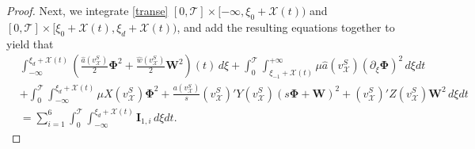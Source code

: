 \documentclass[10pt,a4paper]{amsart}
\def\T{\mathcal{T}}
\def\X{\mathcal{X}}
\def\ph{\mathbf{\Phi}}
\def\p{\partial}
\def\vsx{v^S_{\mathcal{X}}}
\def\w{\mathbf{W}}
\begin{document}
\begin{proof}
	 Next, we integrate \eqref{transe} $[0,\T]\times[-\infty,\xi_0+\X(t))$ and $[0,\T]\times[\xi_0+\X(t),\xi_d+\X(t))$, and add the resulting equations together to yield that
	 \begin{equation}\label{neg-part}
	 	\begin{aligned}
	 		&\int_{-\infty}^{\xi_d+\X(t)}\left(\frac{\hat{a}(\vsx)}{2}\ph^2+\frac{\hat{w}(\vsx)}{2}\w^2\right)(t)\,d\xi+\int_{0}^{\T}\int_{\xi_{-1}+\X(t)}^{+\infty}\mu \hat{a}(\vsx)(\p_{\xi}\ph)^2\,d\xi dt\\
	 		&+\int_{0}^{\T}\int_{-\infty}^{\xi_d+\X(t)}\mu X(\vsx)\ph^2+\frac{a(\vsx)}{s}(\vsx)'Y(\vsx)(s\ph+\w)^2+(\vsx)'Z(\vsx)\w^2\,d\xi dt\\
	 		&=\sum_{i=1}^{6}\int_{0}^{\T}\int_{-\infty}^{\xi_d+\X(t)}\textbf{I}_{1,i}\,d\xi dt.
	 	\end{aligned}
	 \end{equation}
	

\end{proof}
\end{document}
